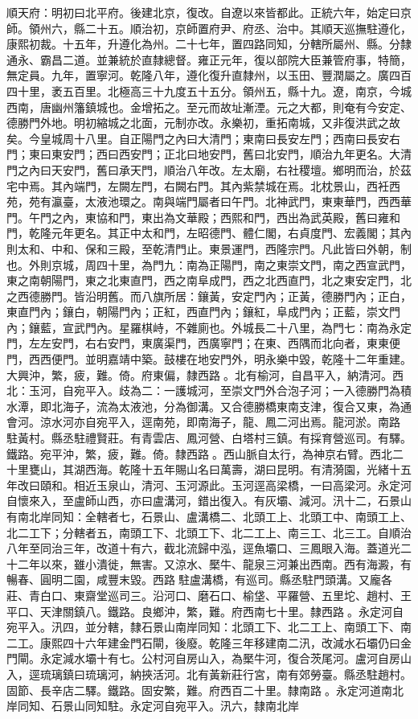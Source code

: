 \begin{pinyinscope}
順天府：明初曰北平府。後建北京，復改。自遼以來皆都此。正統六年，始定曰京師。領州六，縣二十五。順治初，京師置府尹、府丞、治中。其順天巡撫駐遵化，康熙初裁。十五年，升遵化為州。二十七年，置四路同知，分轄所屬州、縣。分隸通永、霸昌二道。並兼統於直隸總督。雍正元年，復以部院大臣兼管府事，特簡，無定員。九年，置寧河。乾隆八年，遵化復升直隸州，以玉田、豐潤屬之。廣四百四十里，袤五百里。北極高三十九度五十五分。領州五，縣十九。遼，南京，今城西南，唐幽州籓鎮城也。金增拓之。至元而故址漸湮。元之大都，則奄有今安定、德勝門外地。明初縮城之北面，元制亦改。永樂初，重拓南城，又非復洪武之故矣。今皇城周十八里。自正陽門之內曰大清門；東南曰長安左門；西南曰長安右門；東曰東安門；西曰西安門；正北曰地安門，舊曰北安門，順治九年更名。大清門之內曰天安門，舊曰承天門，順治八年改。左太廟，右社稷壇。鄉明而治，於茲宅中焉。其內端門，左闕左門，右闕右門。其內紫禁城在焉。北枕景山，西衽西苑，苑有瀛臺，太液池環之。南與端門屬者曰午門。北神武門，東東華門，西西華門。午門之內，東協和門，東出為文華殿；西熙和門，西出為武英殿，舊曰雍和門，乾隆元年更名。其正中太和門，左昭德門、體仁閣，右貞度門、宏義閣；其內則太和、中和、保和三殿，至乾清門止。東景運門，西隆宗門。凡此皆曰外朝，制也。外則京城，周四十里，為門九：南為正陽門，南之東崇文門，南之西宣武門，東之南朝陽門，東之北東直門，西之南阜成門，西之北西直門，北之東安定門，北之西德勝門。皆沿明舊。而八旗所居：鑲黃，安定門內；正黃，德勝門內；正白，東直門內；鑲白，朝陽門內；正紅，西直門內；鑲紅，阜成門內；正藍，崇文門內；鑲藍，宣武門內。星羅棋峙，不雜廁也。外城長二十八里，為門七：南為永定門，左左安門，右右安門，東廣渠門，西廣寧門；在東、西隅而北向者，東東便門，西西便門。並明嘉靖中築。鼓樓在地安門外，明永樂中毀，乾隆十二年重建。大興沖，繁，疲，難。倚。府東偏，隸西路。北有榆河，自昌平入，納清河。西北：玉河，自宛平入。歧為二：一護城河，至崇文門外合泡子河；一入德勝門為積水潭，即北海子，流為太液池，分為御溝。又合德勝橋東南支津，復合又東，為通會河。涼水河亦自宛平入，逕南苑，即南海子，龍、鳳二河出焉。龍河淤。南路駐黃村。縣丞駐禮賢莊。有青雲店、鳳河營、白塔村三鎮。有採育營巡司。有驛。鐵路。宛平沖，繁，疲，難。倚。隸西路。西山脈自太行，為神京右臂。西北二十里甕山，其湖西海。乾隆十五年賜山名曰萬壽，湖曰昆明。有清漪園，光緒十五年改曰頤和。相近玉泉山，清河、玉河源此。玉河逕高梁橋，一曰高梁河。永定河自懷來入，至盧師山西，亦曰盧溝河，錯出復入。有灰壩、減河。汛十二，石景山有南北岸同知：全轄者七，石景山、盧溝橋二、北頭工上、北頭工中、南頭工上、北二工下；分轄者五，南頭工下、北頭工下、北二工上、南三工、北三工。自順治八年至同治三年，改道十有六，截北流歸中泓，逕魚壩口、三鳳眼入海。蓋道光二十二年以來，雖小潰徙，無害。又涼水、檿牛、龍泉三河兼出西南。西有海澱，有暢春、圓明二園，咸豐末毀。西路駐盧溝橋，有巡司。縣丞駐門頭溝。又龐各莊、青白口、東齋堂巡司三。沿河口、磨石口、榆垡、平羅營、五里坨、趙村、王平口、天津關鎮八。鐵路。良鄉沖，繁，難。府西南七十里。隸西路。永定河自宛平入。汛四，並分轄，隸石景山南岸同知：北頭工下、北二工上、南頭工下、南二工。康熙四十六年建金門石閘，後廢。乾隆三年移建南二汛，改減水石壩仍曰金門閘。永定減水壩十有七。公村河自房山入，為檿牛河，復合茨尾河。盧河自房山入，逕琉璃鎮曰琉璃河，納挾活河。北有黃新莊行宮，南有郊勞臺。縣丞駐趙村。固節、長辛店二驛。鐵路。固安繁，難。府西百二十里。隸南路。永定河道南北岸同知、石景山同知駐。永定河自宛平入。汛六，隸南北岸
\end{pinyinscope}
